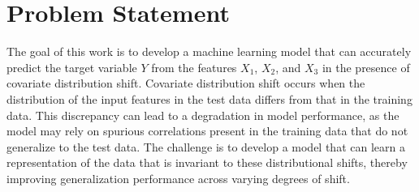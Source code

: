 \chapter*{Problem Statement}

\label{sec:problem_statement}
The goal of this work is to develop a machine learning model that can accurately predict the target variable $Y$ from the features $X_1$, $X_2$, and $X_3$ in the presence of covariate distribution shift. Covariate distribution shift occurs when the distribution of the input features in the test data differs from that in the training data. This discrepancy can lead to a degradation in model performance, as the model may rely on spurious correlations present in the training data that do not generalize to the test data. The challenge is to develop a model that can learn a representation of the data that is invariant to these distributional shifts, thereby improving generalization performance across varying degrees of shift.